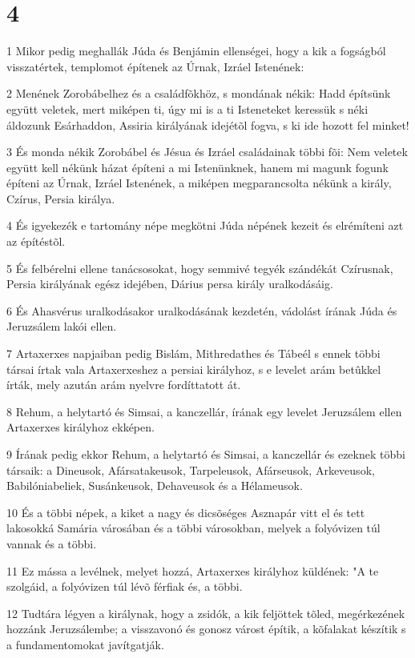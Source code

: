 \chapter{4}

\par 1 Mikor pedig meghallák Júda és Benjámin ellenségei, hogy a kik a fogságból visszatértek, templomot építenek az Úrnak, Izráel Istenének:
\par 2 Menének Zorobábelhez és a családfõkhöz, s mondának nékik: Hadd építsünk együtt veletek, mert miképen ti, úgy mi is a ti Isteneteket keressük s néki áldozunk Esárhaddon, Assiria királyának idejétõl fogva, s ki ide hozott fel minket!
\par 3 És monda nékik Zorobábel és Jésua és Izráel családainak többi fõi: Nem veletek együtt kell nékünk házat építeni a mi Istenünknek, hanem mi magunk fogunk építeni az Úrnak, Izráel Istenének, a miképen megparancsolta nékünk a király, Czírus, Persia királya.
\par 4 És igyekezék e tartomány népe megkötni Júda népének kezeit és elrémíteni azt az építéstõl.
\par 5 És felbérelni ellene tanácsosokat, hogy semmivé tegyék szándékát Czírusnak, Persia királyának egész idejében, Dárius persa király uralkodásáig.
\par 6 És Ahasvérus uralkodásakor uralkodásának kezdetén, vádolást írának Júda és Jeruzsálem lakói ellen.
\par 7 Artaxerxes napjaiban pedig Bislám, Mithredathes és Tábeél s ennek többi társai írtak vala Artaxerxeshez a persiai királyhoz, s e levelet arám betûkkel írták, mely azután arám nyelvre fordíttatott át.
\par 8 Rehum, a helytartó és Simsai, a kanczellár, írának egy levelet Jeruzsálem ellen Artaxerxes királyhoz ekképen.
\par 9 Írának pedig ekkor Rehum, a helytartó és Simsai, a kanczellár és ezeknek többi társaik: a Dineusok, Afársatakeusok, Tarpeleusok, Afárseusok, Arkeveusok, Babilóniabeliek, Susánkeusok, Dehaveusok és a Hélameusok.
\par 10 És a többi népek, a kiket a nagy és dicsõséges Asznapár vitt el és tett lakosokká Samária városában és a többi városokban, melyek a folyóvizen túl vannak és a többi.
\par 11 Ez mássa a levélnek, melyet hozzá, Artaxerxes királyhoz küldének: "A te szolgáid, a folyóvizen túl lévõ férfiak és, a többi.
\par 12 Tudtára légyen a királynak, hogy a zsidók, a kik feljöttek tõled, megérkezének hozzánk Jeruzsálembe; a visszavonó és gonosz várost építik, a kõfalakat készítik s a fundamentomokat javítgatják.
